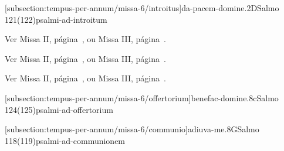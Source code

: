 \def\Prefix{subsection:tempus-per-annum/missa-6}

[\Prefix/introitus]{da-pacem-domine.2D}{Salmo 121(122)}{psalmi-ad-introitum}

\begin{rubrica}
  Ver Missa II, página~\pageref{subsection:tempus-per-annum/missa-2/psalmus-responsorius}, ou Missa III, página~\pageref{subsection:tempus-per-annum/missa-3/psalmus-responsorius}.
\end{rubrica}

\begin{rubrica}
  Ver Missa II, página~\pageref{subsection:tempus-per-annum/missa-2/alleluia}, ou Missa III, página~\pageref{subsection:tempus-per-annum/missa-3/alleluia}.
\end{rubrica}

\begin{rubrica}
  Ver Missa II, página~\pageref{subsection:tempus-per-annum/missa-2/psalmus-alleluiaticus}, ou Missa III, página~\pageref{subsection:tempus-per-annum/missa-3/psalmus-alleluiaticus}.
\end{rubrica}

\AllowPageFlush

[\Prefix/offertorium]{benefac-domine.8c}{Salmo 124(125)}{psalmi-ad-offertorium}

\AllowPageFlush

[\Prefix/communio]{adiuva-me.8G}{Salmo 118(119)}{psalmi-ad-communionem}